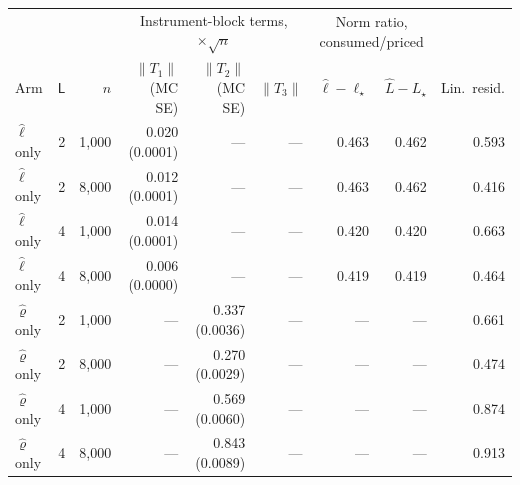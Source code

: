 \begin{tabular}{lrrrrrrrr}
\toprule
 & & & \multicolumn{3}{c}{Instrument-block terms, $\times\sqrt n$} & \multicolumn{2}{c}{Norm ratio, consumed/priced} & \\
\cmidrule(lr){4-6}\cmidrule(lr){7-8}
Arm & $\mathsf L$ & $n$ & $\|T_1\|$ (MC SE) & $\|T_2\|$ (MC SE) & $\|T_3\|$ & $\hat\ell-\ell_\star$ & $\hat L-L_\star$ & Lin.\ resid. \\
\midrule
$\hat\ell$ only & 2 & 1,000 & 0.020 (0.0001) & --- & --- & 0.463 & 0.462 & 0.593 \\
$\hat\ell$ only & 2 & 8,000 & 0.012 (0.0001) & --- & --- & 0.463 & 0.462 & 0.416 \\
$\hat\ell$ only & 4 & 1,000 & 0.014 (0.0001) & --- & --- & 0.420 & 0.420 & 0.663 \\
$\hat\ell$ only & 4 & 8,000 & 0.006 (0.0000) & --- & --- & 0.419 & 0.419 & 0.464 \\
$\hat\varrho$ only & 2 & 1,000 & --- & 0.337 (0.0036) & --- & --- & --- & 0.661 \\
$\hat\varrho$ only & 2 & 8,000 & --- & 0.270 (0.0029) & --- & --- & --- & 0.474 \\
$\hat\varrho$ only & 4 & 1,000 & --- & 0.569 (0.0060) & --- & --- & --- & 0.874 \\
$\hat\varrho$ only & 4 & 8,000 & --- & 0.843 (0.0089) & --- & --- & --- & 0.913 \\
\bottomrule
\end{tabular}
